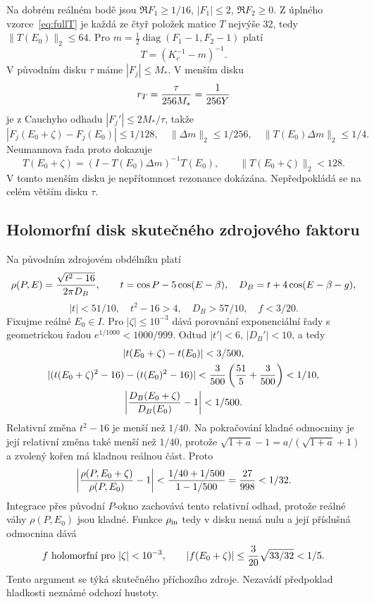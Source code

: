 \documentclass[11pt,a4paper]{article}
\theoremstyle{remark}\newtheorem{remark}[theorem]{Poznámka}
\numberwithin{equation}{section}
\begin{document}
Na dobrém reálném bodě jsou \(\Re F_1\ge1/16\), \(|F_1|\le2\), \(\Re F_2\ge0\). Z úplného vzorce~\eqref{eq:fullT} je každá ze čtyř položek matice \(T\) nejvýše 32, tedy \(\|T(E_0)\|_2\le64\).
Pro \(m=\tfrac12\operatorname{diag}(F_1-1,F_2-1)\) platí
\[
T=(K_c^{-1}-m)^{-1}.
\]
V původním disku \(\tau\) máme \(|F_j|\le M_*\). V menším disku
\begin{equation}
r_T={\tau\over256M_*}={1\over256Y}
\label{eq:Tdisk}
\end{equation}
je z Cauchyho odhadu \(|F_j'|\le2M_*/\tau\), takže
\[
|F_j(E_0+\zeta)-F_j(E_0)|\le1/128,
\quad \|\Delta m\|_2\le1/256,
\quad \|T(E_0)\Delta m\|_2\le1/4.
\]
Neumannova řada proto dokazuje
\begin{equation}
T(E_0+\zeta)=(I-T(E_0)\Delta m)^{-1}T(E_0),
\qquad \|T(E_0+\zeta)\|_2<128.
\label{eq:Tanalytic}
\end{equation}
V tomto menším disku je nepřítomnost rezonance dokázána. Nepředpokládá se na celém větším disku \(\tau\).

\subsection{Holomorfní disk skutečného zdrojového faktoru}

Na původním zdrojovém obdélníku platí
\[
\rho(P,E)={\sqrt{t^2-16}\over2\pi D_B},\qquad
t=\cos P-5\cos(E-\beta),\quad
D_B=t+4\cos(E-\beta-g),
\]
\[
|t|<51/10,\quad t^2-16>4,\quad D_B>57/10,\quad f<3/20.
\]
Fixujme reálné \(E_0\in I\). Pro \(|\zeta|\le10^{-3}\) dává porovnání exponenciální řady s geometrickou řadou
\(e^{1/1000}<1000/999\). Odtud \(|t'|<6\), \(|D_B'|<10\), a tedy
\begin{gather*}
|t(E_0+\zeta)-t(E_0)|<3/500,\\
|(t(E_0+\zeta)^2-16)-(t(E_0)^2-16)|
<{3\over500}\left({51\over5}+{3\over500}\right)<1/10,\\
\left|{D_B(E_0+\zeta)\over D_B(E_0)}-1\right|<1/500.
\end{gather*}
Relativní změna \(t^2-16\) je menší než \(1/40\). Na pokračování kladné odmocniny je její relativní změna také menší než \(1/40\), protože
\(\sqrt{1+a}-1=a/(\sqrt{1+a}+1)\) a zvolený kořen má kladnou reálnou část. Proto
\[
\left|{\rho(P,E_0+\zeta)\over\rho(P,E_0)}-1\right|
<{1/40+1/500\over1-1/500}
={27\over998}<1/32.
\]
Integrace přes původní \(P\)-okno zachovává tento relativní odhad, protože reálné váhy \(\rho(P,E_0)\) jsou kladné. Funkce \(\rho_{\rm in}\) tedy v disku nemá nulu a její příslušná odmocnina dává
\begin{equation}
f\text{ holomorfní pro }|\zeta|<10^{-3},\qquad
|f(E_0+\zeta)|\le{3\over20}\sqrt{33/32}<1/5.
\label{eq:fanalytic}
\end{equation}
Tento argument se týká skutečného příchozího zdroje. Nezavádí předpoklad hladkosti neznámé odchozí hustoty.
\end{document}
